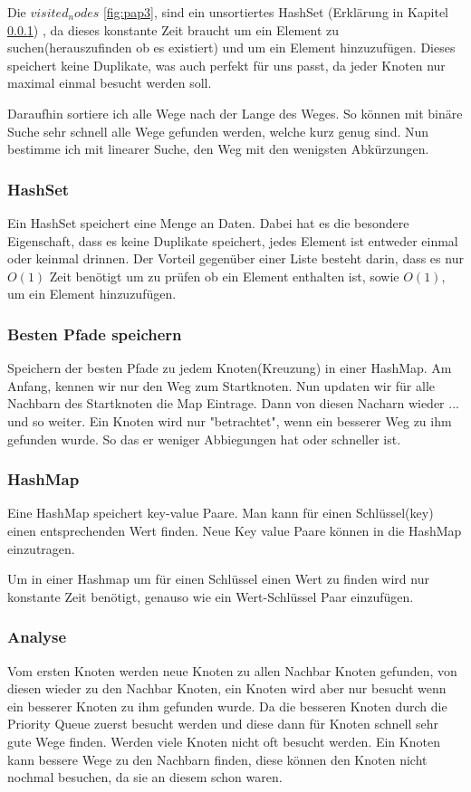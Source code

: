 \documentclass[a4paper,12pt,arial]{scrartcl}
\begin{document}
Die $visited_nodes$ \ref{fig:pap3}, sind ein unsortiertes HashSet (Erklärung in Kapitel \ref{sec:HashSet}) , da dieses konstante Zeit braucht um ein Element zu suchen(herauszufinden ob es existiert) und um ein Element hinzuzufügen.
Dieses speichert keine Duplikate, was auch perfekt für uns passt, da jeder Knoten nur maximal einmal besucht werden soll.
\par
Daraufhin sortiere ich alle Wege nach der Lange des Weges. So können mit binäre Suche sehr schnell alle Wege gefunden werden, welche kurz genug sind. Nun bestimme ich mit linearer Suche, den Weg mit den wenigsten Abkürzungen.


\subsubsection{HashSet}\label{sec:HashSet}
Ein HashSet speichert eine Menge an Daten. Dabei hat es die besondere Eigenschaft, dass es keine Duplikate speichert, jedes Element ist entweder einmal oder keinmal drinnen.
Der Vorteil gegenüber einer Liste besteht darin, dass es nur $O(1)$ Zeit benötigt um zu prüfen ob ein Element enthalten ist, sowie $O(1)$, um ein Element hinzuzufügen.

\subsubsection{Besten Pfade speichern}
Speichern der besten Pfade zu jedem Knoten(Kreuzung) in einer HashMap.
Am Anfang, kennen wir nur den Weg zum Startknoten.
Nun updaten wir für alle Nachbarn des Startknoten die Map Eintrage. Dann von diesen Nacharn wieder ... und so weiter.
Ein Knoten wird nur "betrachtet", wenn ein besserer Weg zu ihm gefunden wurde. So das er weniger Abbiegungen hat oder schneller ist.
\subsubsection{HashMap}
Eine HashMap speichert key-value Paare.
Man kann für einen Schlüssel(key) einen entsprechenden Wert finden.
Neue Key value Paare können in die HashMap einzutragen.

Um in einer Hashmap um für einen Schlüssel einen Wert zu finden wird nur konstante Zeit benötigt, genauso wie ein Wert-Schlüssel Paar einzufügen.

\subsubsection{Analyse}
Vom ersten Knoten werden neue Knoten zu allen Nachbar Knoten gefunden, von diesen wieder zu den Nachbar Knoten, ein Knoten wird aber nur besucht wenn ein besserer Knoten zu ihm gefunden wurde. Da die besseren Knoten durch die Priority Queue zuerst besucht werden und diese dann für Knoten schnell sehr gute Wege finden. Werden viele Knoten nicht oft besucht werden. Ein Knoten kann bessere Wege zu den Nachbarn finden, diese können den Knoten nicht nochmal besuchen, da sie an diesem schon waren.
\end{document}
